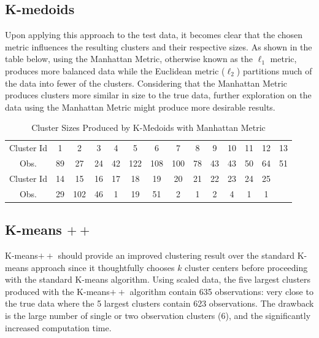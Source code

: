 \documentclass[12pt]{article}
\begin{document}
\subsection{K-medoids}
Upon applying this approach to the test data, it becomes clear that the chosen metric influences the resulting clusters and their respective sizes.  As shown in the table below, using the Manhattan Metric, otherwise known as the $\ell_1$ metric, produces more balanced data while the Euclidean metric ($\ell_2$) partitions much of the data into fewer of the clusters.  %
Considering that the Manhattan Metric produces clusters more similar in size to the true data, further exploration on the data using the Manhattan Metric might produce more desirable results.

\begin{table}[h]
\center
\caption{Cluster Sizes Produced by K-Medoids with Manhattan Metric}
\begin{tabular}{c c c c c c c c c c c c c c}
\hline
Cluster Id & 1 & 2  & 3  & 4  & 5   & 6   & 7   & 8  & 9  & 10 & 11 & 12 & 13 \\
Obs. 	   &89 & 27 & 24 & 42 & 122 & 108 & 100 & 78 & 43 & 43 & 50 & 64 & 51 \\
\hline
Cluster Id & 14 & 15  & 16 & 17 & 18 & 19 & 20 & 21 & 22 & 23 & 24 & 25 & \\
Obs.       & 29 & 102 & 46 & 1  & 19 & 51 & 2  & 1  & 2  & 4  & 1  & 1  &\\
\hline
\end{tabular}
\end{table}


\subsection{K-means $++$}
K-means$++$ should provide an improved clustering result over the standard K-means approach since it thoughtfully chooses $k$ cluster centers before proceeding with the standard K-means algorithm.  Using scaled data, the five largest clusters produced with the K-means$++$ algorithm contain 635 observations: very close to the true data where the 5 largest clusters contain 623 observations.  The drawback is the large number of single or two observation clusters (6), and the significantly increased computation time.
\end{document}
